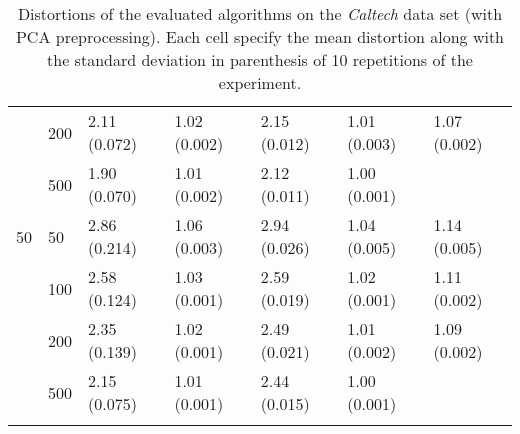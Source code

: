 \begin{longtable}{lllllll}
   & 200 &  2.11 (0.072) &   1.02 (0.002) &  2.15 (0.012) &         1.01 (0.003) &  1.07 (0.002) \\
   & 500 &  1.90 (0.070) &   1.01 (0.002) &  2.12 (0.011) &         1.00 (0.001) &  \\
 \midrule
50 & 50  &  2.86 (0.214) &   1.06 (0.003) &  2.94 (0.026) &         1.04 (0.005) &  1.14 (0.005) \\
   & 100 &  2.58 (0.124) &   1.03 (0.001) &  2.59 (0.019) &         1.02 (0.001) &  1.11 (0.002) \\
   & 200 &  2.35 (0.139) &   1.02 (0.001) &  2.49 (0.021) &         1.01 (0.002) &  1.09 (0.002) \\
   & 500 &  2.15 (0.075) &   1.01 (0.001) &  2.44 (0.015) &         1.00 (0.001) &            \\
\bottomrule
\caption{Distortions of the evaluated algorithms on the \textit{Caltech} data set (with PCA preprocessing). Each cell specify the mean distortion along with the standard deviation in parenthesis of 10 repetitions of the experiment.}
\label{tab:distortions-mean-std-caltech-pca}
\end{longtable}

